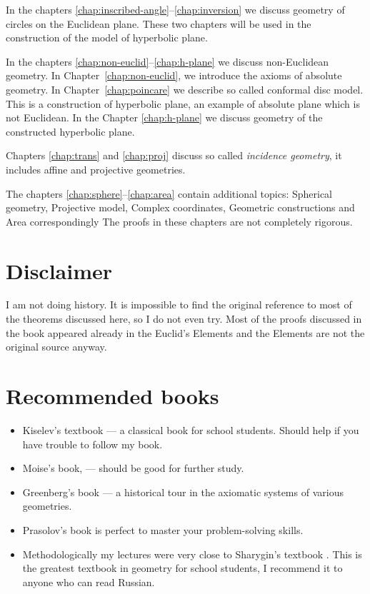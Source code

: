 \medskip

In the chapters \ref{chap:inscribed-angle}--\ref{chap:inversion} we discuss geometry of circles on the Euclidean plane. 
These two chapters 
will be used in the construction of the model of hyperbolic plane.

In the chapters \ref{chap:non-euclid}--\ref{chap:h-plane}
we discuss non-Euclidean geometry.
In Chapter~\ref{chap:non-euclid},
we introduce the axioms of absolute geometry.
In Chapter~\ref{chap:poincare}
we describe so called conformal disc model.
This is a construction of hyperbolic plane,
an example of absolute plane which is not Euclidean.
In the Chapter \ref{chap:h-plane} we discuss geometry of the constructed hyperbolic plane.

Chapters \ref{chap:trans} 
and 
\ref{chap:proj} 
discuss so called {}\emph{incidence geometry},
it includes affine and projective geometries.

The chapters \ref{chap:sphere}--\ref{chap:area} contain additional topics:
Spherical geometry, 
Projective model,
Complex coordinates,
Geometric constructions
and Area correspondingly
The proofs in these chapters are not completely rigorous.

\section*{Disclaimer}

I am not doing history.
It is  impossible to find the original reference to most of the theorems discussed here, so I do not even try.
Most of the proofs discussed in the book 
appeared already in the Euclid's Elements
and the  Elements are not the original source anyway.

\section*{Recommended books}

\begin{itemize}
\item Kiselev's textbook \cite{kiselev} ---
a classical book for school students.
Should help if you have trouble to follow my book.

\item Moise's book, \cite{moise} ---
should be good for further study.

\item Greenberg's book \cite{greenberg}  --- a historical tour in the axiomatic systems of various geometries.

\item Prasolov's book \cite{prasolov} is perfect to master your problem-solving skills. 

\item Methodologically my lectures
were very close to Sharygin's  textbook \cite{sharygin}.
This is the greatest textbook in geometry for school students,
I recommend it to anyone who can read Russian.


\end{itemize}

